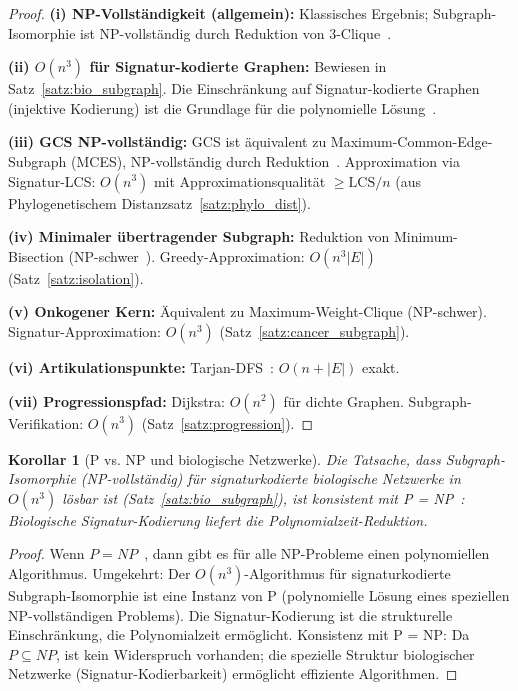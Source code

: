 ﻿\documentclass[a4paper,12pt]{article}
\theoremstyle{plain}
\newtheorem{korollar}{Korollar}
\theoremstyle{definition}
\theoremstyle{remark}
\begin{document}
\begin{proof}
\textbf{(i) NP-Vollst\"andigkeit (allgemein):}
Klassisches Ergebnis; Subgraph-Isomorphie ist NP-vollst\"andig durch
Reduktion von 3-Clique~\cite{cook1971}.

\textbf{(ii) $O(n^3)$ f\"ur Signatur-kodierte Graphen:}
Bewiesen in Satz~\ref{satz:bio_subgraph}.
Die Einschr\"ankung auf Signatur-kodierte Graphen (injektive Kodierung)
ist die Grundlage f\"ur die polynomielle L\"osung~\cite{epp2026subgraph}.

\textbf{(iii) GCS NP-vollst\"andig:}
GCS ist \"aquivalent zu Maximum-Common-Edge-Subgraph (MCES),
NP-vollst\"andig durch Reduktion~\cite{garey1979}.
Approximation via Signatur-LCS: $O(n^3)$ mit
Approximationsqualit\"at $\geq \mathrm{LCS}/n$ (aus Phylogenetischem Distanzsatz~\ref{satz:phylo_dist}).

\textbf{(iv) Minimaler \"ubertragender Subgraph:}
Reduktion von Minimum-Bisection (NP-schwer~\cite{garey1979}).
Greedy-Approximation: $O(n^3 |E|)$ (Satz~\ref{satz:isolation}).

\textbf{(v) Onkogener Kern:}
\"Aquivalent zu Maximum-Weight-Clique (NP-schwer).
Signatur-Approximation: $O(n^3)$ (Satz~\ref{satz:cancer_subgraph}).

\textbf{(vi) Artikulationspunkte:}
Tarjan-DFS~\cite{tarjan1972}: $O(n+|E|)$ exakt.

\textbf{(vii) Progressionspfad:}
Dijkstra: $O(n^2)$ f\"ur dichte Graphen.
Subgraph-Verifikation: $O(n^3)$ (Satz~\ref{satz:progression}).
\end{proof}

\begin{korollar}[P vs. NP und biologische Netzwerke]
\label{kor:pnp_bio}
Die Tatsache, dass Subgraph-Isomorphie (NP-vollst\"andig) f\"ur
signaturkodierte biologische Netzwerke in $O(n^3)$ l\"osbar ist
(Satz~\ref{satz:bio_subgraph}), ist konsistent mit P = NP~\cite{epp2026lsat}:
Biologische Signatur-Kodierung liefert die Polynomialzeit-Reduktion.
\end{korollar}

\begin{proof}
Wenn $P = NP$~\cite{epp2026lsat}, dann gibt es f\"ur alle NP-Probleme
einen polynomiellen Algorithmus.
Umgekehrt: Der $O(n^3)$-Algorithmus f\"ur signaturkodierte Subgraph-Isomorphie
ist eine Instanz von P (polynomielle L\"osung eines speziellen
NP-vollst\"andigen Problems).
Die Signatur-Kodierung ist die strukturelle Einschr\"ankung,
die Polynomialzeit erm\"oglicht.
Konsistenz mit P = NP: Da $P \subseteq NP$, ist kein Widerspruch vorhanden;
die spezielle Struktur biologischer Netzwerke (Signatur-Kodierbarkeit)
erm\"oglicht effiziente Algorithmen.
\end{proof}
\end{document}
